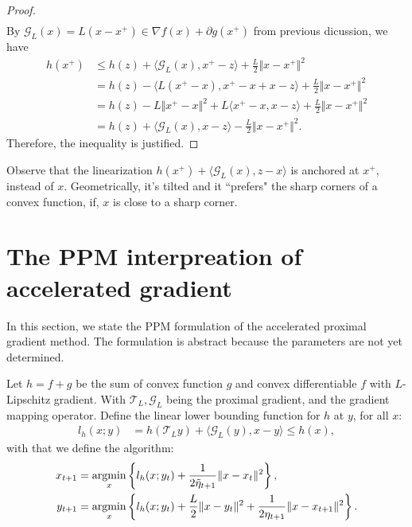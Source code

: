 \documentclass[12pt]{article}
\begin{document}
\begin{proof}
{\begin{align*}
        \end{align*}
        }
        By $\mathcal G_L(x) = L(x - x^+) \in \nabla f(x) + \partial g(x^+)$ from previous dicussion, we have 
        \begin{align*}
            h(x^+) &\le 
            h(z) + \langle \mathcal G_L(x), x^+ - z\rangle + \frac{L}{2}\Vert x - x^+\Vert^2
            \\
            &= h(z) - \langle L(x^+ - x), x^+ - x + x - z \rangle 
            + 
            \frac{L}{2}\Vert x - x^+\Vert^2
            \\
            &= 
            h(z) - L\Vert x^+ - x\Vert^2 
            + L \langle x^+ - x, x - z\rangle
            + \frac{L}{2}\Vert x - x^+\Vert^2
            \\
            &= h(z) + \langle \mathcal G_L(x), x - z\rangle - 
            \frac{L}{2}\Vert x - x^+\Vert^2. 
        \end{align*}
        Therefore, the inequality is justified. 
    \end{proof}
    \begin{remark}
        Observe that the linearization $h(x^+) + \langle \mathcal G_L(x), z - x\rangle$ is anchored at $x^+$, instead of $x$. 
        Geometrically, it's tilted and it ``prefers" the sharp corners of a convex function, if, $x$ is close to a sharp corner. 
    \end{remark}

\section{The PPM interpreation of accelerated gradient}\label{sec:ppm_interp_of_ag}
    In this section, we state the PPM formulation of the accelerated proximal gradient method. 
    The formulation is abstract because the parameters are not yet determined. 
    \begin{definition}
    \label{def:ag_prox_grad_ppm}
        Let $h=f + g$ be the sum of convex function $g$ and convex differentiable $f$ with $L$-Lipschitz gradient. 
        With $\mathcal T_L, \mathcal G_L$ being the proximal gradient, and the gradient mapping operator. 
        Define the linear lower bounding function for $h$ at $y$, for all $x$: 
        $$
        \begin{aligned}
            l_h(x; y) &= h(\mathcal T_L y) + \langle \mathcal G_L(y), x - y \rangle \le h(x), 
        \end{aligned}
        $$
        with that we define the algorithm:
        $$
        \begin{aligned}
            x_{t + 1} &= \mathop{\rm argmin}\limits_{x} \left\lbrace
                l_h(x; y_t) + \frac{1}{2\tilde \eta_{t + 1}} 
                \Vert x - x_t\Vert^2
            \right\rbrace,
            \\
            y_{t + 1}&= 
            \mathop{\rm argmin}\limits_{x}
            \left\lbrace
                l_h(x; y_t) + \frac{L}{2}\Vert x - y_t\Vert^2 + 
                \frac{1}{2\eta_{t + 1}} \Vert x - x_{t + 1}\Vert^2
            \right\rbrace.
        \end{aligned}
        $$
    \end{definition}
\end{document}
